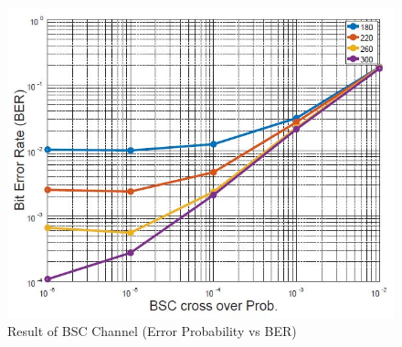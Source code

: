 \documentclass[12pt,a4paper,onecolumn]{article}
\begin{document}
\begin{figure}[htb]  
\vspace{-0.1in}
  \begin{center}
\includegraphics[scale=0.4]{BSC.JPG} 
\caption{Result of BSC Channel (Error Probability vs BER)}
\label{BSC_Channel}
 \end{center}
\vspace{-0.1in}
\end{figure}
\end{document}
